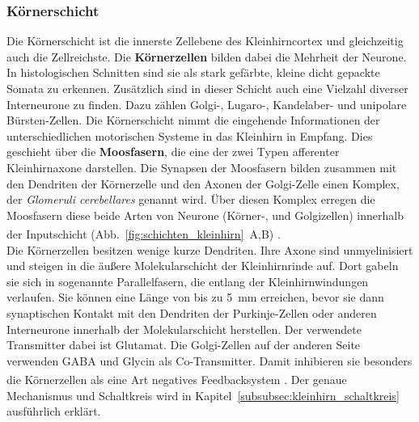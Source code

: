 \subsubsection*{Körnerschicht} 
Die Körnerschicht ist die innerste Zellebene des Kleinhirncortex und gleichzeitig auch die Zellreichste. Die \textbf{Körnerzellen} bilden dabei die Mehrheit der Neurone. In histologischen Schnitten sind sie als stark gefärbte, kleine dicht gepackte Somata zu erkennen. Zusätzlich sind in dieser Schicht auch eine Vielzahl diverser Interneurone zu finden. Dazu zählen Golgi-, Lugaro-, Kandelaber- und unipolare Bürsten-Zellen. Die Körnerschicht nimmt die eingehende Informationen der unterschiedlichen motorischen Systeme in das Kleinhirn in Empfang. Dies geschieht über die \textbf{Moosfasern}, die eine der zwei Typen afferenter Kleinhirnaxone darstellen. Die Synapsen der Moosfasern bilden zusammen mit den Dendriten der Körnerzelle und den Axonen der Golgi-Zelle einen Komplex, der \textit{Glomeruli cerebellares} genannt wird. Über diesen Komplex erregen die Moosfasern diese beide Arten von Neurone (Körner-, und Golgizellen) innerhalb der Inputschicht (Abb.~\ref{fig:schichten_kleinhirn}~A,B) \textsuperscript{\cite[Kap.~42]{kandel2013principles}}.\\
Die Körnerzellen besitzen wenige kurze Dendriten. Ihre Axone sind unmyelinisiert und steigen in die äußere Molekularschicht der Kleinhirnrinde auf. Dort gabeln sie sich in sogenannte Parallelfasern, die entlang der Kleinhirnwindungen verlaufen. Sie können eine Länge von bis zu 5~mm erreichen, bevor sie dann synaptischen Kontakt mit den Dendriten der Purkinje-Zellen oder anderen Interneurone innerhalb der Molekularschicht herstellen. Der verwendete Transmitter dabei ist Glutamat. Die Golgi-Zellen auf der anderen Seite verwenden GABA und Glycin als Co-Transmitter. Damit inhibieren sie besonders die Körnerzellen als eine Art negatives Feedbacksystem \textsuperscript{\cite[Kap.~9]{paxinos2014rat}}. Der genaue Mechanismus und Schaltkreis wird in Kapitel~\ref{subsubsec:kleinhirn_schaltkreis} ausführlich erklärt. 

